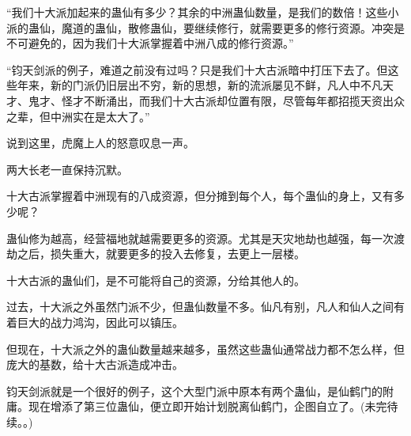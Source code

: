 \begin{this_body}
“我们十大派加起来的蛊仙有多少？其余的中洲蛊仙数量，是我们的数倍！这些小派的蛊仙，魔道的蛊仙，散修蛊仙，要继续修行，就需要更多的修行资源。冲突是不可避免的，因为我们十大派掌握着中洲八成的修行资源。”

“钧天剑派的例子，难道之前没有过吗？只是我们十大古派暗中打压下去了。但这些年来，新的门派仍旧层出不穷，新的思想，新的流派屡见不鲜，凡人中不凡天才、鬼才、怪才不断涌出，而我们十大古派却位置有限，尽管每年都招揽天资出众之辈，但中洲实在是太大了。”

说到这里，虎魔上人的怒意叹息一声。

两大长老一直保持沉默。

十大古派掌握着中洲现有的八成资源，但分摊到每个人，每个蛊仙的身上，又有多少呢？

蛊仙修为越高，经营福地就越需要更多的资源。尤其是天灾地劫也越强，每一次渡劫之后，损失重大，就要更多的投入去修复，去更上一层楼。

十大古派的蛊仙们，是不可能将自己的资源，分给其他人的。

过去，十大派之外虽然门派不少，但蛊仙数量不多。仙凡有别，凡人和仙人之间有着巨大的战力鸿沟，因此可以镇压。

但现在，十大派之外的蛊仙数量越来越多，虽然这些蛊仙通常战力都不怎么样，但庞大的基数，给十大古派造成冲击。

钧天剑派就是一个很好的例子，这个大型门派中原本有两个蛊仙，是仙鹤门的附庸。现在增添了第三位蛊仙，便立即开始计划脱离仙鹤门，企图自立了。(未完待续。。)

\end{this_body}

